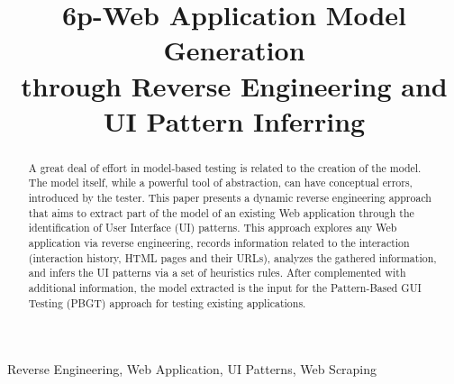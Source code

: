 \documentclass[conference]{IEEEtran}
\begin{document}
%
\title{6p-Web Application Model Generation \\through Reverse Engineering and UI Pattern Inferring}

\author{
\and
{}
}






\maketitle

\begin{abstract}
A great deal of effort in model-based testing is related to the creation of the model. The model itself, while a powerful tool of abstraction, can have conceptual errors, introduced by the tester. This paper presents a dynamic reverse engineering approach that aims to extract part of the model of an existing Web application through the identification of User Interface (UI) patterns. This approach explores any Web application via reverse engineering, records information related to the interaction (interaction history, HTML pages and their URLs), analyzes the gathered information, and infers the UI patterns via a set of heuristics rules. After complemented with additional information, the model extracted is the input for the Pattern-Based GUI Testing (PBGT) approach for testing existing applications.
\end{abstract}
\begin{IEEEkeywords} Reverse Engineering, Web Application, UI Patterns, Web Scraping \end{IEEEkeywords}
\end{document}
